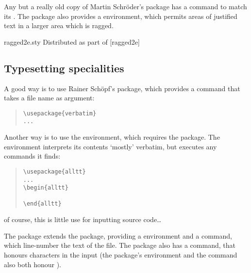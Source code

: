 Any but a really old copy of Martin Schr\"oder's 
package has a  command to match its %
.  The
package also provides a  environment, which
permits areas of justified text in a larger area which is ragged.
\begin{ctanrefs}
\item[ragged2e.sty]Distributed as part of [ragged2e]
\end{ctanrefs}

\subsection{Typesetting specialities}


A good way is to use Rainer Sch\"opf's  package,
which provides a command  that takes a file name as
argument:
\begin{quote}
\begin{verbatim}
\usepackage{verbatim}
...

\end{verbatim}
\end{quote}
Another way is to use the  environment, which
requires the  package.  The environment interprets its
contents `mostly' verbatim, but executes any \AllTeX{} commands it
finds:
\begin{quote}
\begin{verbatim}
\usepackage{alltt}
...
\begin{alltt}

\end{alltt}
\end{verbatim}
\end{quote}
of course, this is little use for inputting \AllTeX{} source
code\dots{}

The  package extends the  package,
providing a  environment and a 
command, which line-number the text of the file.  The package also has
a  command, that honours  characters in
the input (the package's  environment and the
 command also both honour ).

